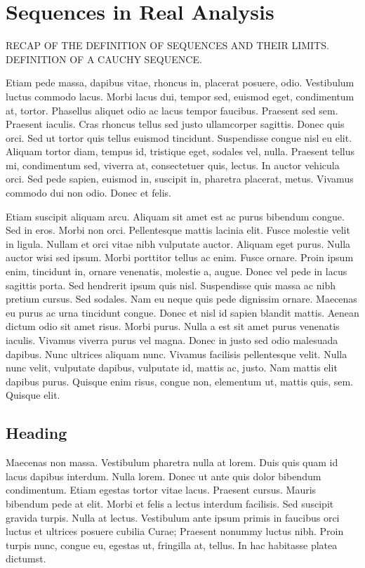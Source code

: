 \section{Sequences in Real Analysis}
RECAP OF THE DEFINITION OF SEQUENCES AND THEIR LIMITS. DEFINITION OF A CAUCHY SEQUENCE.

Etiam pede massa, dapibus vitae, rhoncus in, placerat posuere, odio. Vestibulum luctus
commodo lacus. Morbi lacus dui, tempor sed, euismod eget, condimentum at, tortor.
Phasellus aliquet odio ac lacus tempor faucibus. Praesent sed sem. Praesent iaculis. Cras
rhoncus tellus sed justo ullamcorper sagittis. Donec quis orci. Sed ut tortor quis tellus
euismod tincidunt. Suspendisse congue nisl eu elit. Aliquam tortor diam, tempus id, tristique
eget, sodales vel, nulla. Praesent tellus mi, condimentum sed, viverra at, consectetuer quis,
lectus. In auctor vehicula orci. Sed pede sapien, euismod in, suscipit in, pharetra placerat,
metus. Vivamus commodo dui non odio. Donec et felis.

Etiam suscipit aliquam arcu. Aliquam sit amet est ac purus bibendum congue. Sed in eros.
Morbi non orci. Pellentesque mattis lacinia elit. Fusce molestie velit in ligula. Nullam et
orci vitae nibh vulputate auctor. Aliquam eget purus. Nulla auctor wisi sed ipsum. Morbi
porttitor tellus ac enim. Fusce ornare. Proin ipsum enim, tincidunt in, ornare venenatis,
molestie a, augue. Donec vel pede in lacus sagittis porta. Sed hendrerit ipsum quis nisl.
Suspendisse quis massa ac nibh pretium cursus. Sed sodales. Nam eu neque quis pede
dignissim ornare. Maecenas eu purus ac urna tincidunt congue.
Donec et nisl id sapien blandit mattis. Aenean dictum odio sit amet risus. Morbi purus.
Nulla a est sit amet purus venenatis iaculis. Vivamus viverra purus vel magna. Donec in
justo sed odio malesuada dapibus. Nunc ultrices aliquam nunc. Vivamus facilisis pellentesque
velit. Nulla nunc velit, vulputate dapibus, vulputate id, mattis ac, justo. Nam mattis elit
dapibus purus. Quisque enim risus, congue non, elementum ut, mattis quis, sem. Quisque
elit.

\subsection{Heading}
Maecenas non massa. Vestibulum pharetra nulla at lorem. Duis quis quam id lacus dapibus
interdum. Nulla lorem. Donec ut ante quis dolor bibendum condimentum. Etiam egestas
tortor vitae lacus. Praesent cursus. Mauris bibendum pede at elit. Morbi et felis a lectus
interdum facilisis. Sed suscipit gravida turpis. Nulla at lectus. Vestibulum ante ipsum
primis in faucibus orci luctus et ultrices posuere cubilia Curae; Praesent nonummy luctus
nibh. Proin turpis nunc, congue eu, egestas ut, fringilla at, tellus. In hac habitasse platea
dictumst.


